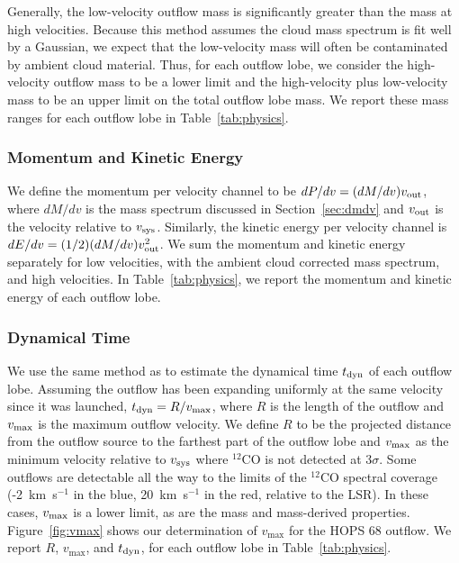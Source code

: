 \documentclass[twocolumn]{aastex63}
\newcommand{\example}{HOPS 68}
\newcommand{\kms}{km~s$^{-1}$}
\newcommand{\co}[1][]{\ensuremath{^{#1}}CO}
\begin{document}
Generally, the low-velocity outflow mass is significantly greater than the mass at high velocities. Because this method assumes the cloud mass spectrum is fit well by a Gaussian, we expect that the low-velocity mass will often be contaminated by ambient cloud material. Thus, for each outflow lobe, we consider the high-velocity outflow mass to be a lower limit and the high-velocity plus low-velocity mass to be an upper limit on the total outflow lobe mass. We report these mass ranges for each outflow lobe in Table~\ref{tab:physics}.

\subsubsection{Momentum and Kinetic Energy}

We define the momentum per velocity channel to be $dP/dv = (dM/dv) v_{\rm out}$, where $dM/dv$ is the mass spectrum discussed in Section~\ref{sec:dmdv} and $v_{\rm out}$ is the velocity relative to $v_{\rm sys}$. Similarly, the kinetic energy per velocity channel is $dE/dv = (1/2) (dM/dv)  v_{\rm out}^2$. We sum the momentum and kinetic energy separately for low velocities, with the ambient cloud corrected mass spectrum, and high velocities. In Table~\ref{tab:physics}, we report the momentum and kinetic energy of each outflow lobe.

\subsubsection{Dynamical Time}\label{sec:tdyn}
We use the same method as \citet{Curtis10} to estimate the dynamical time $t_{\rm dyn}$ of each outflow lobe. Assuming the outflow has been expanding uniformly at the same velocity since it was launched, $t_{\rm dyn} = R / v_{\rm max}$, where $R$ is the length of the outflow and $v_{\rm max}$ is the maximum outflow velocity. We define $R$ to be the projected distance from the outflow source to the farthest part of the outflow lobe and $v_{\rm max}$ as the minimum velocity relative to $v_{\rm sys}$ where \co[12]{} is not detected at $3\sigma$. Some outflows are detectable all the way to the limits of the \co[12]{} spectral coverage (-2~\kms{} in the blue, 20~\kms{} in the red, relative to the LSR). In these cases, $v_{\rm max}$ is a lower limit, as are the mass and mass-derived properties. Figure~\ref{fig:vmax} shows our determination of $v_{\max}$ for the \example{} outflow. We report $R$, $v_{\max}$, and $t_{\rm dyn}$, for each outflow lobe in Table~\ref{tab:physics}.
\end{document}
